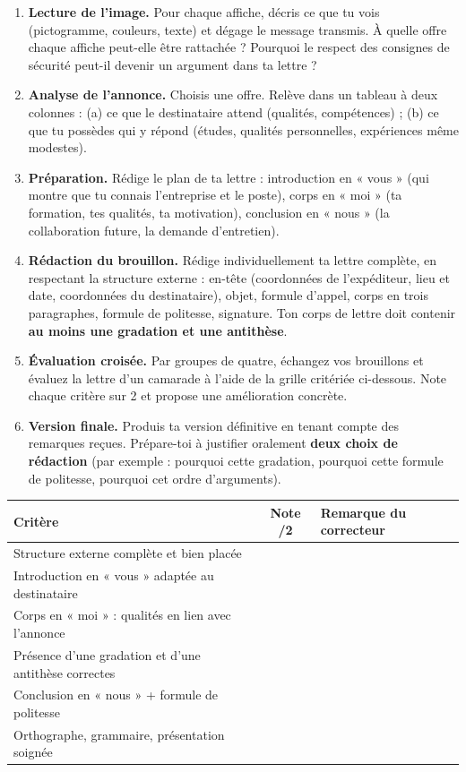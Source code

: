 \documentclass[11pt]{article}
\begin{document}
\begin{enumerate}
\item \textbf{Lecture de l'image.} Pour chaque affiche, décris ce que tu vois (pictogramme, couleurs, texte) et dégage le message transmis. À quelle offre chaque affiche peut-elle être rattachée ? Pourquoi le respect des consignes de sécurité peut-il devenir un argument dans ta lettre ?
\item \textbf{Analyse de l'annonce.} Choisis une offre. Relève dans un tableau à deux colonnes : (a) ce que le destinataire attend (qualités, compétences) ; (b) ce que tu possèdes qui y répond (études, qualités personnelles, expériences même modestes).
\item \textbf{Préparation.} Rédige le plan de ta lettre : introduction en « vous » (qui montre que tu connais l'entreprise et le poste), corps en « moi » (ta formation, tes qualités, ta motivation), conclusion en « nous » (la collaboration future, la demande d'entretien).
\item \textbf{Rédaction du brouillon.} Rédige individuellement ta lettre complète, en respectant la structure externe : en-tête (coordonnées de l'expéditeur, lieu et date, coordonnées du destinataire), objet, formule d'appel, corps en trois paragraphes, formule de politesse, signature. Ton corps de lettre doit contenir \textbf{au moins une gradation et une antithèse}.
\item \textbf{Évaluation croisée.} Par groupes de quatre, échangez vos brouillons et évaluez la lettre d'un camarade à l'aide de la grille critériée ci-dessous. Note chaque critère sur 2 et propose une amélioration concrète.
\item \textbf{Version finale.} Produis ta version définitive en tenant compte des remarques reçues. Prépare-toi à justifier oralement \textbf{deux choix de rédaction} (par exemple : pourquoi cette gradation, pourquoi cette formule de politesse, pourquoi cet ordre d'arguments).
\end{enumerate}

\begin{center}
\begin{tabularx}{\linewidth}{|l|c|X|}
\hline
\rowcolor{popblueL} \textbf{Critère} & \textbf{Note /2} & \textbf{Remarque du correcteur} \\
\hline
Structure externe complète et bien placée & & \\
\hline
Introduction en « vous » adaptée au destinataire & & \\
\hline
Corps en « moi » : qualités en lien avec l'annonce & & \\
\hline
Présence d'une gradation et d'une antithèse correctes & & \\
\hline
Conclusion en « nous » + formule de politesse & & \\
\hline
Orthographe, grammaire, présentation soignée & & \\
\hline
\end{tabularx}
\end{center}
\end{document}
